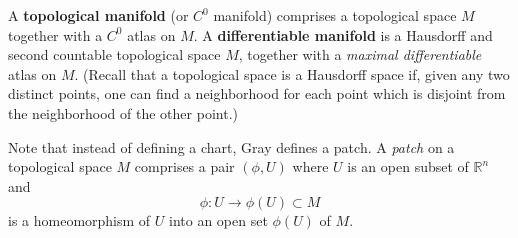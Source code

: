 \documentclass{book}
\begin{document}
		A \textbf{topological manifold} (or $C^0$ manifold) comprises a topological space $M$ together with a $C^0$ atlas on $M$. A \textbf{differentiable manifold} is a Hausdorff and second countable topological space $M$, together with a \emph{maximal differentiable} atlas on $M$. (Recall that a topological space is a Hausdorff space if, given any two distinct points, one can find a neighborhood for each point which is disjoint from the neighborhood of the other point.)
		
		Note that instead of defining a chart, Gray defines a patch. A \emph{patch} on a topological space $M$ comprises a pair $(\phi, U)$ where $U$ is an open subset of $\mathbb{R}^n$ and
		\begin{equation}
			\phi:U\rightarrow\phi(U)\subset M
		\end{equation}
		is a homeomorphism of $U$ into an open set $\phi(U)$ of $M$.
\end{document}
